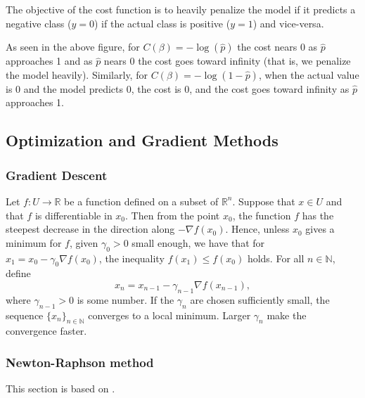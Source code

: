 The objective of the cost function is to heavily penalize the model if it predicts a negative class ($y=0$) if the actual class is positive ($y=1$) and vice-versa. 

As seen in the above figure, for $C(\beta) = - \log(\hat{p})$ the cost nears 0 as $\hat{p}$ approaches 1 and as $\hat{p}$ nears 0 the cost goes toward infinity (that is, we penalize the model heavily). Similarly, for $C(\beta) = - \log(1 - \hat{p})$, when the actual value is 0 and the model predicts 0, the cost is 0, and the cost goes toward infinity as $\hat{p}$ approaches 1.


\subsection{Optimization and Gradient Methods}\label{sec:optim theory}

\subsubsection{Gradient Descent}\label{sec:gradient descent}
Let $f\colon U\to\mathbb{R}$ be a function defined on a subset of $\mathbb{R}^n$. Suppose that $x\in U$ and that $f$ is differentiable in $x_0$. Then from the point $x_0$, the function $f$ has the steepest decrease in the direction along $-\nabla f(x_0)$. Hence, unless $x_0$ gives a minimum for $f$, given $\gamma_0 > 0$ small enough, we have that for $x_1 = x_0 - \gamma_0\nabla f(x_0)$, the inequality $f(x_1)\le f(x_0)$ holds. For all $n\in\mathbb{N}$, define
\begin{equation*}
    x_n = x_{n-1} - \gamma_{n-1}\nabla f(x_{n-1}),
\end{equation*}
where $\gamma_{n-1}>0$ is some number. If the $\gamma_{n}$ are chosen sufficiently small, the sequence $\{x_n\}_{n\in\mathbb{N}}$ converges to a local minimum. Larger $\gamma_{n}$ make the convergence faster.

\subsubsection{Newton-Raphson method}\label{sec:newton-raphson method}

This section is based on \cite[Section 5.6]{FVA}.


